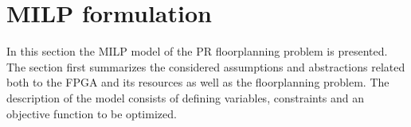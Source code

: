 \section{MILP formulation}
In this section the MILP model of the PR floorplanning problem is presented. The section first summarizes the considered assumptions and abstractions related both to the FPGA and its resources as well as the floorplanning problem. The description of the model consists of defining variables, constraints and an objective function to be optimized. 






